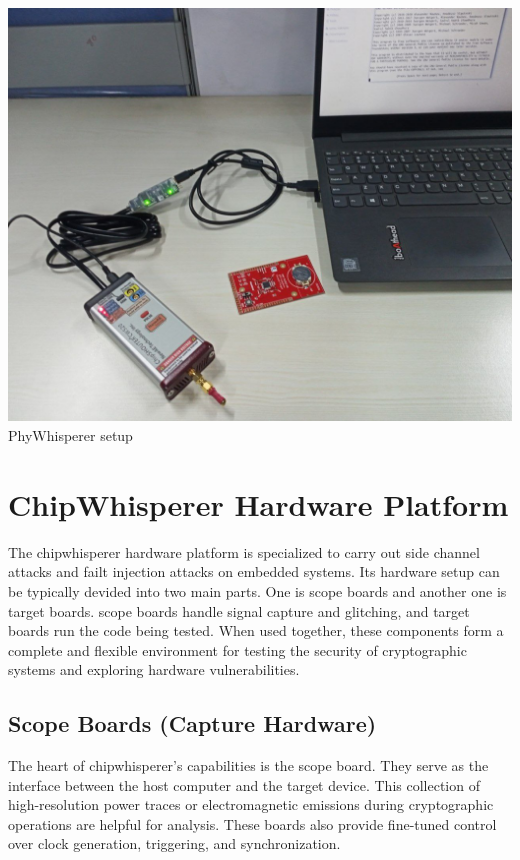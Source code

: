   \begin{minipage}[b]{0.3\linewidth}
    \centering
    \includegraphics[width=\linewidth]{images/phy_hardware.png}
    \smallskip
    PhyWhisperer setup
  \end{minipage}
\section{ChipWhisperer Hardware Platform}
The chipwhisperer hardware platform is specialized to carry out side channel attacks and failt injection attacks on embedded systems. Its hardware setup can be typically devided into two main parts. One is scope boards and another one is target boards.
scope boards handle signal capture and glitching, and target boards run the code being tested. When used together, these components form a complete and flexible environment for testing the security of cryptographic systems and exploring hardware vulnerabilities.
\subsection{Scope Boards (Capture Hardware)}
The heart of chipwhisperer's capabilities is the scope board. They serve as the interface between the host computer and the target device. This collection of high-resolution power traces or electromagnetic emissions during cryptographic operations are helpful for analysis. These boards also provide fine-tuned control over clock generation, triggering, and synchronization.

